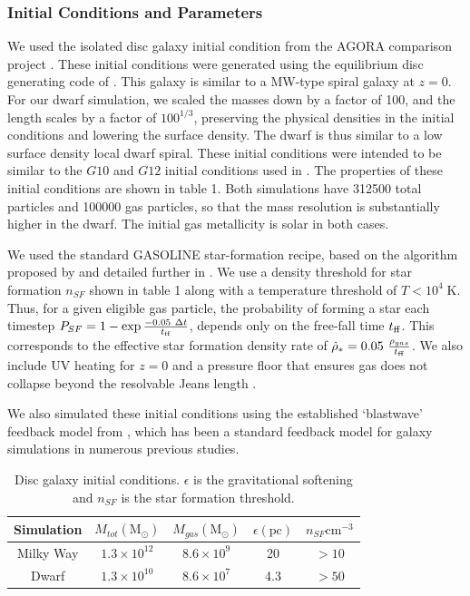 \subsubsection{Initial Conditions and Parameters}
We used the isolated disc galaxy initial condition from the AGORA comparison
project \citep{Kim2013}.  These initial conditions were generated using the
equilibrium disc generating code of \citet{Springel2005}.
This galaxy is similar to a MW-type spiral galaxy
at $z=0$.  For our dwarf simulation, we scaled the masses down by a factor of
100, and the length scales by a factor of $100^{1/3}$, preserving the physical
densities in the initial conditions and lowering the surface density.  The dwarf
is thus similar to a low surface density local dwarf spiral.  These initial
conditions were intended to be similar to the $G10$ and $G12$ initial conditions
used in \citet{DallaVecchia2012}. The properties of these initial conditions are
shown in table 1.  Both simulations have 312500 total particles and 100000 gas
particles, so that the mass resolution is substantially higher in the dwarf.  The
initial gas metallicity is solar in both cases.

We used the standard {\sc GASOLINE} star-formation recipe, based on the
algorithm proposed by \citet{Katz1992} and detailed further in
\citet{Stinson2006}.  We use a density threshold for star formation $n_{SF}$
shown in table 1 along with a temperature threshold of $T < 10^4\;\mathrm{K}$.
Thus, for a given eligible gas particle, the probability of forming a star each
timestep $P_{SF} = 1-\exp{-0.05\ \Delta t\over t_{\rm ff}}$, depends only on the
free-fall time $t_{\rm ff}$.  This corresponds to the effective star formation
density rate of $\dot \rho_* = 0.05\ \frac{\rho_{gas}}{t_{\rm ff}}$.  We also
include UV heating for $z=0$ \citep[as in][]{Shen2010} and a pressure floor that
ensures gas does not collapse beyond the resolvable Jeans length
\citep{Machacek2001}.  

We also simulated these initial conditions using the established `blastwave'
feedback model from \citep{Stinson2006}, which has been a standard feedback
model for galaxy simulations in numerous previous studies.
\begin{table}
    \begin{tabular}{ c c c c c}
        \hline
        Simulation & $M_{tot} \mathrm{(M_\odot)}$ & $M_{gas} \mathrm{(M_\odot)}$
        & $\epsilon \mathrm{(pc)}$ & $n_{SF} \mathrm{cm^{-3}}$\\
        \hline
        Milky Way & $1.3\times10^{12}$ & $8.6\times10^9$ & 20  & $>10$\\
        Dwarf & $1.3\times10^{10}$ &  $8.6\times10^7$ & 4.3 & $>50$\\
    \end{tabular}
    \caption{Disc galaxy initial conditions.  $\epsilon$ is the gravitational
    softening and $n_{SF}$ is the star formation threshold.}
\end{table}

